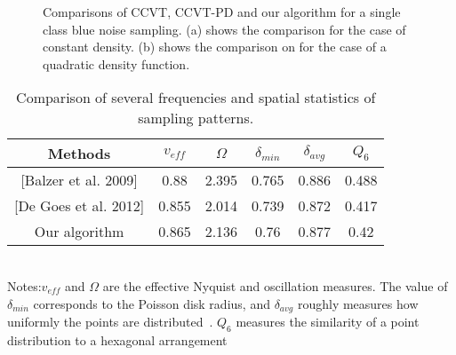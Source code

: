 \begin{figure}[ht]
\centering
{}
\caption{
Comparisons of CCVT, CCVT-PD and our algorithm for a single class blue noise sampling.
(a) shows the comparison for the case of constant density.
(b) shows the comparison on for the case of a quadratic density function. }
\label{one-class-sampling}
\end{figure}



\begin{table}
\caption{\label{comparing-table}
Comparison of several frequencies and spatial statistics of sampling patterns.
}
 \begin{tabular}{c|c|c|c|c|c}

  \hline
   Methods & $v_{eff}$ & $\Omega$ & $\delta_{min}$ & $\delta_{avg}$ & $Q_6$ \\ \hline
  {[Balzer et al. 2009]}& 0.88& 2.395 & 0.765 & 0.886 & 0.488 \\
  {[De Goes et al. 2012]} & 0.855 & 2.014 & 0.739 & 0.872 & 0.417 \\
   Our algorithm & 0.865 & 2.136 & 0.76 & 0.877 & 0.42 \\ \hline
  \end{tabular}\\
  Notes:$v_{eff} $ and $\Omega$ are the effective Nyquist and oscillation measures.
The value of $\delta_{min}$ corresponds to the Poisson disk radius,
and $\delta_{avg}$ roughly measures how uniformly the points are distributed~\cite{schlomer:2011:farthest}.
$Q_6$ measures the similarity of a point distribution to a hexagonal arrangement~\cite{kansal:2000:nonequilibrium}
\end{table}


